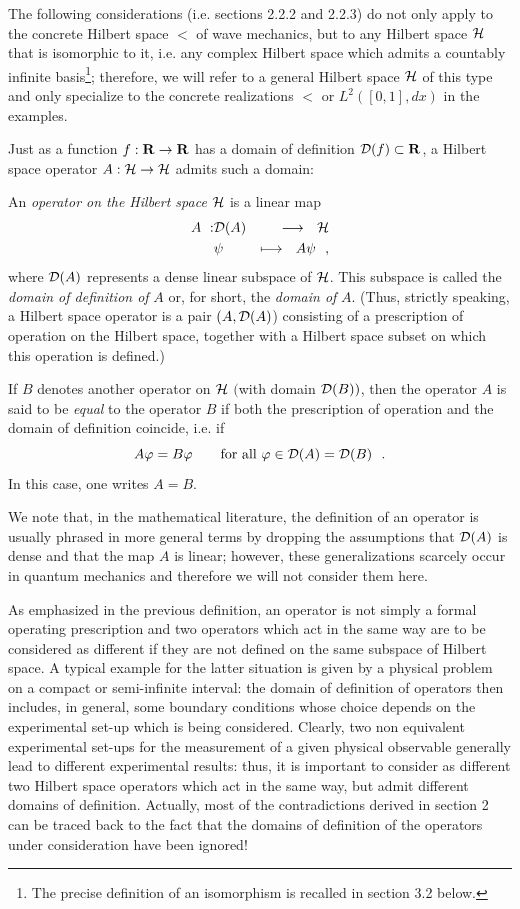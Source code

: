 \documentclass[a4wide,12pt]{report}
\begin{document}
The following considerations (i.e. sections 2.2.2 and 2.2.3) 
do not only apply to 
the concrete Hilbert space $\lt$ of wave mechanics, but to any  
Hilbert space ${\cal H}$ that is isomorphic to it,
i.e. any complex Hilbert space which admits a countably
infinite basis\footnote{The precise definition of an 
isomorphism is recalled in section 3.2 below.}; 
therefore, we will refer to a general Hilbert space
${\cal H}$ of this type and only specialize to the 
concrete realizations $\lt$
or $L^2 ([0,1], dx)$ in the examples.  


Just as a function $f : {\bf R} \to {\bf R}$ 
has a domain of definition 
${\cal D}(f) \subset {\bf R}$,  
a Hilbert space operator $A : {\cal H} \to {\cal H}$ 
admits such a domain: 
\begin{defin}
An {\em operator on the Hilbert space ${\cal H}$} is a linear map 
\begin{eqnarray}
A \ : & {\cal D} (A) & \longrightarrow \ \ {\cal H}
\\
 & \psi  & \longmapsto \ \
A  \psi 
\ \ ,
\nonumber
\end{eqnarray}
 where ${\cal D}(A)$ represents a dense linear subspace of ${\cal H}$.
This subspace is called 
 the {\em  domain of definition of} $A$
or, for short, the {\em  domain of} $A$.  
(Thus, strictly speaking, a 
Hilbert space operator
is a pair $(A, {\cal D}(A)$) consisting of 
a prescription of operation on the Hilbert space, together with 
a Hilbert space subset on which this operation is 
defined.)
 
If $B$ denotes another operator on ${\cal H}$ 
$($with domain ${\cal D} (B))$, then the operator $A$ 
is said to be {\em equal} 
to the operator $B$ if both 
the prescription of operation and the domain
of definition coincide, i.e. if
\[
A \varphi =  B \varphi 
\qquad \mbox{for all} \ \varphi \in {\cal D} (A) = {\cal D} (B)
\ \ . 
\]
In this case, one writes $A=B$. 
\end{defin}
We note that, in the mathematical literature,
the definition of an operator 
is usually phrased in more general terms 
by dropping the 
assumptions that ${\cal D} (A)$ is dense and that the map $A$
is linear; however, these generalizations scarcely occur 
in quantum mechanics and therefore we will not consider them here. 

As emphasized in the previous definition, 
an operator is not simply a formal operating 
prescription and two operators
which act in the same way are to be considered 
as different if they
are not defined on the same subspace of Hilbert space.
A typical example for the latter situation is given by  
a physical problem on a compact or semi-infinite interval: the 
domain of definition of operators then includes, in general,
some boundary conditions whose choice 
depends on the experimental set-up which 
is being considered. 
Clearly, two non equivalent experimental set-ups 
for the measurement of a given physical observable 
generally lead to different experimental results:
thus, it is important to consider as different
two Hilbert space operators which act in the same way,
but admit different domains of definition.
Actually, most of the contradictions derived 
in section  2 can be traced back to the 
fact that the domains of definition
of the operators
under consideration have been ignored!
\end{document}
